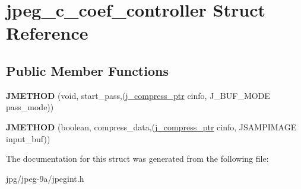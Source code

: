\hypertarget{structjpeg__c__coef__controller}{\section{jpeg\+\_\+c\+\_\+coef\+\_\+controller Struct Reference}
\label{structjpeg__c__coef__controller}
}
\subsection*{Public Member Functions}
\begin{DoxyCompactItemize}
\item 
\hypertarget{structjpeg__c__coef__controller_a975b8ac2bcd4ea8065eb676ea805d78e}{{\bfseries J\+M\+E\+T\+H\+O\+D} (void, start\+\_\+pass,(\hyperlink{structjpeg__compress__struct}{j\+\_\+compress\+\_\+ptr} cinfo, J\+\_\+\+B\+U\+F\+\_\+\+M\+O\+D\+E pass\+\_\+mode))}\label{structjpeg__c__coef__controller_a975b8ac2bcd4ea8065eb676ea805d78e}

\item 
\hypertarget{structjpeg__c__coef__controller_a1aaf8a93ba0bd239b36f4d48657c88ee}{{\bfseries J\+M\+E\+T\+H\+O\+D} (boolean, compress\+\_\+data,(\hyperlink{structjpeg__compress__struct}{j\+\_\+compress\+\_\+ptr} cinfo, J\+S\+A\+M\+P\+I\+M\+A\+G\+E input\+\_\+buf))}\label{structjpeg__c__coef__controller_a1aaf8a93ba0bd239b36f4d48657c88ee}

\end{DoxyCompactItemize}


The documentation for this struct was generated from the following file\+:\begin{DoxyCompactItemize}
\item 
jpg/jpeg-\/9a/jpegint.\+h\end{DoxyCompactItemize}
